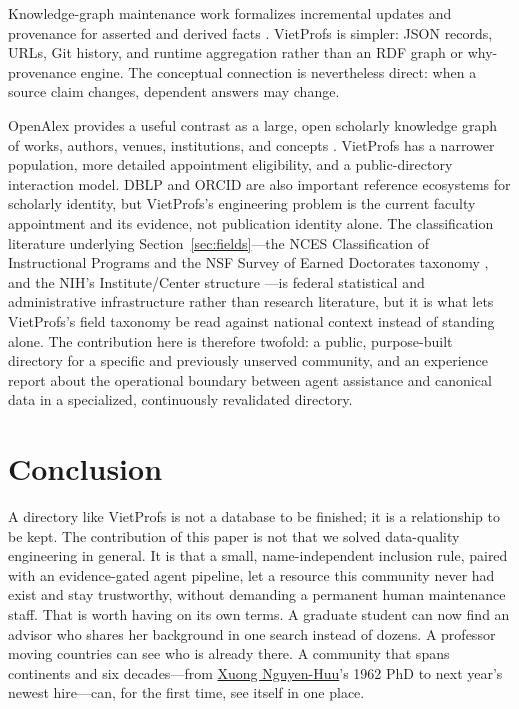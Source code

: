 \documentclass[11pt]{article}
\newcommand{\vplink}[2]{\href{https://vietprofs.roars.dev/?q=#1}{#2}}
\begin{document}
Knowledge-graph maintenance work formalizes incremental updates and provenance for asserted and derived facts \cite{belhajjame2023maintenance}.
VietProfs is simpler: JSON records, URLs, Git history, and runtime aggregation rather than an RDF graph or why-provenance engine.
The conceptual connection is nevertheless direct: when a source claim changes, dependent answers may change.

OpenAlex provides a useful contrast as a large, open scholarly knowledge graph of works, authors, venues, institutions, and concepts \cite{priem2022openalex}.
VietProfs has a narrower population, more detailed appointment eligibility, and a public-directory interaction model.
DBLP and ORCID are also important reference ecosystems for scholarly identity, but VietProfs's engineering problem is the current faculty appointment and its evidence, not publication identity alone.
The classification literature underlying Section~\ref{sec:fields}---the NCES Classification of Instructional Programs and the NSF Survey of Earned Doctorates taxonomy \cite{nces_cip2020,nsf_sed}, and the NIH's Institute/Center structure \cite{nih_ics}---is federal statistical and administrative infrastructure rather than research literature, but it is what lets VietProfs's field taxonomy be read against national context instead of standing alone.
The contribution here is therefore twofold: a public, purpose-built directory for a specific and previously unserved community, and an experience report about the operational boundary between agent assistance and canonical data in a specialized, continuously revalidated directory.

\section{Conclusion}
A directory like VietProfs is not a database to be finished; it is a relationship to be kept.
The contribution of this paper is not that we solved data-quality engineering in general.
It is that a small, name-independent inclusion rule, paired with an evidence-gated agent pipeline, let a resource this community never had exist and stay trustworthy, without demanding a permanent human maintenance staff.
That is worth having on its own terms.
A graduate student can now find an advisor who shares her background in one search instead of dozens.
A professor moving countries can see who is already there.
A community that spans continents and six decades---from \vplink{Xuong+Nguyen-Huu}{Xuong Nguyen-Huu}'s 1962 PhD to next year's newest hire---can, for the first time, see itself in one place.
\end{document}
